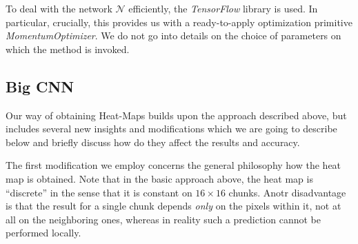 \documentclass[10pt,conference,compsocconf]{IEEEtran}
\newcommand{\cN}{\mathcal{N}}
\begin{document}
To deal with the network $\cN$ efficiently, the {\it TensorFlow} library is used. In particular, crucially, this provides us with a ready-to-apply optimization primitive {\it MomentumOptimizer}. We do not go into details on the choice of parameters on which the method is invoked.

\subsection{Big CNN}
Our way of obtaining Heat-Maps builds upon the approach described above, but includes several new insights and modifications which we are going to describe below and briefly discuss how do they affect the results and accuracy.

The first modification we employ concerns the general philosophy how the heat map is obtained. Note that in the basic approach above, the heat map is ``discrete'' in the sense that it is constant on $16 \times 16$ chunks. Anotr disadvantage is that the result for a single chunk depends \emph{only} on the pixels within it, not at all on the neighboring ones, whereas in reality such a prediction cannot be performed locally.
\end{document}
